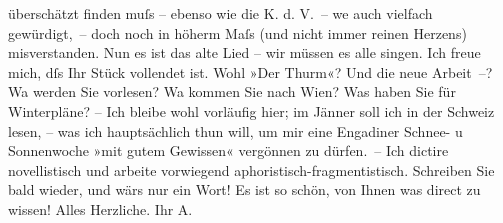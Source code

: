 \begin{ledgroupsized}[t]{13cm}
               überschätzt finden muſs – ebenso wie die K. d. V. –
                  we{\geminationn} auch vielfach gewürdigt, – doch noch in höherm
               Maſs (und nicht immer reinen Herzens) misverstanden. Nun es ist das alte Lied – wir
               müssen es alle singen. Ich freue mich, dſs Ihr Stück vollendet ist. Wohl »Der Thurm«? Und die neue Arbeit –? Wa{\geminationn} werden Sie vorlesen? Wa{\geminationn}
               kommen Sie nach Wien? Was haben Sie für Winterpläne?
               – Ich bleibe wohl vorläufig hier; im Jänner{ }soll {\pb}ich in der Schweiz lesen, – was ich hauptsächlich thun will,
               um mir eine Engadiner Schnee- u Sonnenwoche \strikeout{\textcolor{gray}{ver}} »mit gutem Gewissen« vergönnen
               zu dürfen. – Ich dictire novellistisch und arbeite vorwiegend
               aphoristisch-fragmentistisch. Schreiben Sie bald wieder, und wärs nur ein Wort! Es
               ist so schön, von Ihnen was direct zu wissen! \pend
           \pstart
           Alles Herzliche. Ihr \spacefill\mbox{A.}\pend
           
         
         \endnumbering{}\end{ledgroupsized}  \newcommand{\dateiname}{L02419}\newcommand{\titel}{Arthur Schnitzler an Hugo Hofmannsthal, [5?.] 11. 1924}\newcommand{\editorInnen}{Martin Anton Müller und Gerd-Hermann Susen}
      
